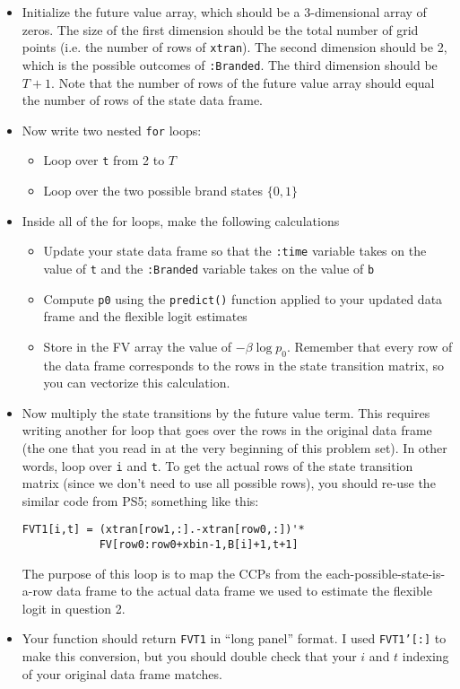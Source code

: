 \documentclass[12pt,english]{article}
\begin{document}
\begin{enumerate}
\begin{enumerate}
\begin{itemize}
            \item Initialize the future value array, which should be a 3-dimensional array of zeros. The size of the first dimension should be the total number of grid points (i.e. the number of rows of \texttt{xtran}). The second dimension should be 2, which is the possible outcomes of \texttt{:Branded}. The third dimension should be $T+1$. Note that the number of rows of the future value array should equal the number of rows of the state data frame.
            \item Now write two nested \texttt{for} loops:
            \begin{itemize}
                \item Loop over \texttt{t} from 2 to $T$
                \item Loop over the two possible brand states $\{0,1\}$
            \end{itemize}
            \item Inside all of the for loops, make the following calculations
            \begin{itemize}
                \item Update your state data frame so that the \texttt{:time} variable takes on the value of \texttt{t} and the \texttt{:Branded} variable takes on the value of \texttt{b}
                \item Compute \texttt{p0} using the \texttt{predict()} function applied to your updated data frame and the flexible logit estimates
                \item Store in the FV array the value of $-\beta \log p_0$. Remember that every row of the data frame corresponds to the rows in the state transition matrix, so you can vectorize this calculation.
            \end{itemize}
            \item Now multiply the state transitions by the future value term. This requires writing another for loop that goes over the rows in the original data frame (the one that you read in at the very beginning of this problem set). In other words, loop over \texttt{i} and \texttt{t}. To get the actual rows of the state transition matrix (since we don't need to use all possible rows), you should re-use the similar code from PS5; something like this:
                \begin{verbatim}
FVT1[i,t] = (xtran[row1,:].-xtran[row0,:])'*
            FV[row0:row0+xbin-1,B[i]+1,t+1]
                \end{verbatim}
            The purpose of this loop is to map the CCPs from the each-possible-state-is-a-row data frame to the actual data frame we used to estimate the flexible logit in question 2.
            \item Your function should return \texttt{FVT1} in ``long panel'' format. I used \texttt{FVT1'[:]} to make this conversion, but you should double check that your $i$ and $t$ indexing of your original data frame matches.
        \end{itemize}
        

\end{enumerate}
\end{enumerate}
\end{document}
